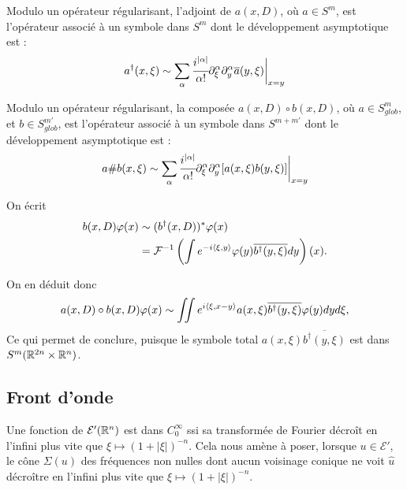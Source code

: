 \begin{corr}
	Modulo un opérateur régularisant, l'adjoint de $a(x,D)$, où $a \in S^m$, est l'opérateur associé à un symbole dans $S^m$ dont le développement asymptotique est :
	\begin{equation*}
		a^{\dagger}(x,\xi)\sim \sum_{\alpha}\cfrac{i^{|\alpha|}}{\alpha!}\partial^{\alpha}_{\xi}\partial^{\alpha}_y\overline{a}(y,\xi)\biggl|_{x=y}
	\end{equation*}
\end{corr}

\begin{corr}
	Modulo un opérateur régularisant, la composée $a(x,D)\circ b(x,D)$, où $a\in S^m_{glob}$, et $b \in S^{m'}_{glob}$, est l'opérateur associé à un symbole dans $S^{m+m'}$ dont le développement asymptotique est :
	\begin{equation}\label{eq:compPDO}
		a\#b(x,\xi)\sim \sum_{\alpha}\cfrac{i^{|\alpha|}}{\alpha!}\partial^{\alpha}_{\xi}\partial^{\alpha}_y[a(x,\xi)b(y,\xi)]\biggl|_{x=y}
	\end{equation}
\end{corr}
\begin{preuve}
	On écrit 
	\begin{align*}
		b(x,D)\varphi(x) &\sim (b^{\dagger}(x,D))^*\varphi(x)\\
		&= \mathcal{F}^{-1}\left(\int e^{-i\langle \xi,y\rangle}\varphi(y)\overline{b^{\dagger}(y,\xi)}dy\right)(x).
	\end{align*}
	
	On en déduit donc
	\begin{equation*}
		a(x,D)\circ b(x,D) \varphi(x) \sim \iint e^{i\langle \xi,x-y\rangle}a(x,\xi)\overline{b^{\dagger}(y,\xi)}\varphi(y)dyd\xi,
	\end{equation*}
	Ce qui permet de conclure, puisque le symbole total  $a(x,\xi)\overline{b^{\dagger}(y,\xi)}$ est dans $S^m(\mathbb{R}^{2n}\times \mathbb{R}^n)$.
\end{preuve}

\subsection{Front d'onde}

Une fonction de $\mathcal{E}'(\mathbb{R}^n)$ est dans $C^{\infty}_0$ ssi sa transformée de Fourier décroît en l'infini plus vite que $\xi \mapsto (1+|\xi|)^{-n}$. Cela nous amène à poser, lorsque $ u \in \mathcal{E}'$, le cône $\Sigma(u)$ des fréquences non nulles dont aucun voisinage conique ne voit $\hat{u}$ décroître en l'infini plus vite que $\xi \mapsto (1+|\xi|)^{-n}$. 

